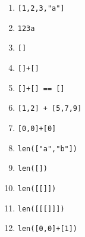 \begin{multicols}{2}
  \begin{enumerate}[label=\emph{\alph*)}]
    \item \texttt{[1,2,3,"a"]}
    \item \texttt{123a}
    \item \texttt{[]}
    \item \texttt{[]+[]}
    \item \texttt{[]+[] == []}
    \item \texttt{[1,2] + [5,7,9]}
    \item \texttt{[0,0]+[0]}
    \item \texttt{len(["a","b"])}
    \item \texttt{len([])}
    \item \texttt{len([[]])}
    \item \texttt{len([[[]]])}
    \item \texttt{len([0,0]+[1])}
  \end{enumerate}
\end{multicols}

%


